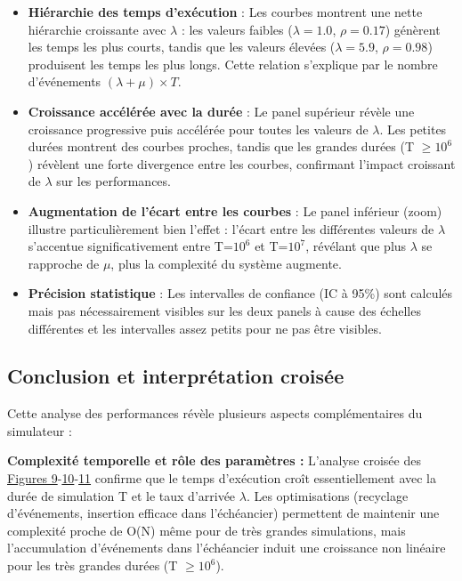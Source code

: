\documentclass[12pt,a4paper]{article}
\newcommand{\ro}{\rho}
\begin{document}
\begin{itemize}
    \item \textbf{Hiérarchie des temps d'exécution} : Les courbes montrent une nette hiérarchie croissante avec $\lambda$ : les valeurs faibles ($\lambda=1.0$, $\ro=0.17$) génèrent les temps les plus courts, tandis que les valeurs élevées ($\lambda=5.9$, $\ro=0.98$) produisent les temps les plus longs. Cette relation s'explique par le nombre d'événements $(\lambda + \mu) \times T$.
    
    \item \textbf{Croissance accélérée avec la durée} : Le panel supérieur révèle une croissance progressive puis accélérée pour toutes les valeurs de $\lambda$. Les petites durées montrent des courbes proches, tandis que les grandes durées (T $\geq 10^6$) révèlent une forte divergence entre les courbes, confirmant l'impact croissant de $\lambda$ sur les performances.
    
    \item \textbf{Augmentation de l'écart entre les courbes} : Le panel inférieur (zoom) illustre particulièrement bien l'effet : l'écart entre les différentes valeurs de $\lambda$ s'accentue significativement entre T=$10^6$ et T=$10^7$, révélant que plus $\lambda$ se rapproche de $\mu$, plus la complexité du système augmente.
    
    \item \textbf{Précision statistique} : Les intervalles de confiance (IC à 95\%) sont calculés mais pas nécessairement visibles sur les deux panels à cause des échelles différentes et les intervalles assez petits pour ne pas être visibles.
\end{itemize}

\subsection{Conclusion et interprétation croisée}

Cette analyse des performances révèle plusieurs aspects complémentaires du simulateur :

\vspace{0.3cm}
\textbf{Complexité temporelle et rôle des paramètres :} L'analyse croisée des \hyperref[fig:exec_time]{Figures 9}-\hyperref[fig:time_per_event]{10}-\hyperref[fig:exec_time_lambda]{11} confirme que le temps d'exécution croît essentiellement avec la durée de simulation T et le taux d'arrivée $\lambda$. Les optimisations (recyclage d'événements, insertion efficace dans l'échéancier) permettent de maintenir une complexité proche de O(N) même pour de très grandes simulations, mais l'accumulation d'événements dans l'échéancier induit une croissance non linéaire pour les très grandes durées (T $\geq 10^6$).
\end{document}
